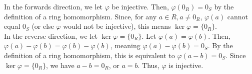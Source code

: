 \documentclass[10pt]{extarticle}
\begin{document}
  In the forwards direction, we let $\varphi$ be injective. Then, $\varphi(0_R) = 0_S$ by the definition of a ring homomorphism. Since, for any $a \in R, a\neq 0_R$, $\varphi(a)$ cannot equal $0_S$ (or else $\varphi$ would not be injective), this means $\ker\varphi = \{0_R\}$.\\

  In the reverse direction, we let $\ker\varphi = \{0_R\}$. Let $\varphi(a) = \varphi(b)$. Then, $\varphi(a) - \varphi(b) = \varphi(b) - \varphi(b)$, meaning $\varphi(a) - \varphi(b) = 0_S$. By the definition of a ring homomorphism, this is equivalent to $\varphi(a-b) = 0_S$. Since $\ker\varphi = \{0_R\}$, we have $a-b = 0_R$, or $a = b$. Thus, $\varphi$ is injective.
\end{document}

